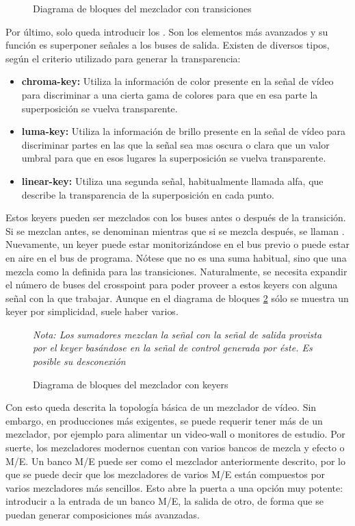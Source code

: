 \documentclass[../main.tex]{subfiles}
\begin{document}
\begin{figure}[H]
    \centering

    \caption{Diagrama de bloques del mezclador con transiciones}
    \label{fig:trans}
\end{figure}


Por último, solo queda introducir los . Son los elementos más avanzados y su función es superponer señales a los buses de salida. Existen de diversos tipos, según el criterio utilizado para generar la transparencia:

\begin{itemize}
    \item \textbf{chroma-key:} Utiliza la información de color presente en la señal de vídeo para discriminar a una cierta gama de colores para que en esa parte la superposición se vuelva transparente.
    \item \textbf{luma-key:} Utiliza la información de brillo presente en la señal de vídeo para discriminar partes en las que la señal sea mas oscura o clara que un valor umbral para que en esos lugares la superposición se vuelva transparente.
    \item \textbf{linear-key:} Utiliza una segunda señal, habitualmente llamada alfa, que describe la transparencia de la superposición en cada punto.
\end{itemize}

Estos keyers pueden ser mezclados con los buses antes o después de la transición. Si se mezclan antes, se denominan  mientras que si se mezcla después, se llaman . Nuevamente, un keyer puede estar monitorizándose en el bus previo o puede estar en aire en el bus de programa. Nótese que no es una suma habitual, sino que una mezcla como la definida para las transiciones. Naturalmente, se necesita expandir el número de buses del crosspoint para poder proveer a estos keyers con alguna señal con la que trabajar. Aunque en el diagrama de bloques \ref{fig:key} sólo se muestra un keyer por simplicidad, suele haber varios.\newline

\begin{figure}[H]
    \centering

    \textit{Nota: Los sumadores mezclan la señal con la señal de salida provista por el keyer basándose en la señal de control generada por éste. Es posible su desconexión}
    \caption{Diagrama de bloques del mezclador con keyers}
    \label{fig:key}
\end{figure}

Con esto queda descrita la topología básica de un mezclador de vídeo. Sin embargo, en producciones más exigentes, se puede requerir tener más de un mezclador, por ejemplo para alimentar un video-wall o monitores de estudio. Por suerte, los mezcladores modernos cuentan con varios bancos de mezcla y efecto o M/E. Un banco M/E puede ser como el mezclador anteriormente descrito, por lo que se puede decir que los mezcladores de varios M/E están compuestos por varios mezcladores más sencillos. Esto abre la puerta a una opción muy potente: introducir a la entrada de un banco M/E, la salida de otro, de forma que se puedan generar composiciones más avanzadas.
\end{document}
